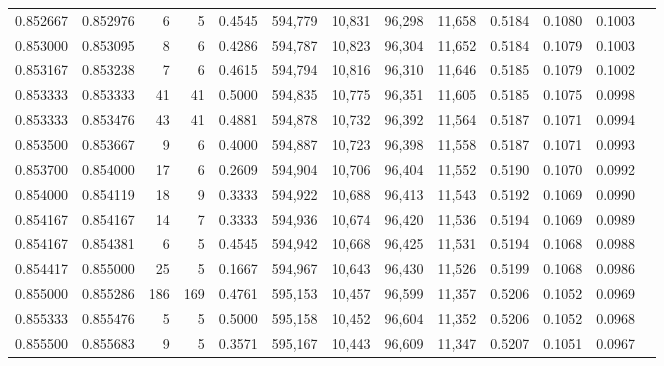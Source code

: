 \begin{tabular}{rrrrrrrrrrrrr}
0.852667 & 0.852976 &     6 &   5 &                                     0.4545 & 594,779 &  10,831 &  96,298 &  11,658 & 0.5184 & 0.1080 & 0.1003 \\
0.853000 & 0.853095 &     8 &   6 &                                     0.4286 & 594,787 &  10,823 &  96,304 &  11,652 & 0.5184 & 0.1079 & 0.1003 \\
0.853167 & 0.853238 &     7 &   6 &                                     0.4615 & 594,794 &  10,816 &  96,310 &  11,646 & 0.5185 & 0.1079 & 0.1002 \\
0.853333 & 0.853333 &    41 &  41 &                                     0.5000 & 594,835 &  10,775 &  96,351 &  11,605 & 0.5185 & 0.1075 & 0.0998 \\
0.853333 & 0.853476 &    43 &  41 &                                     0.4881 & 594,878 &  10,732 &  96,392 &  11,564 & 0.5187 & 0.1071 & 0.0994 \\
0.853500 & 0.853667 &     9 &   6 &                                     0.4000 & 594,887 &  10,723 &  96,398 &  11,558 & 0.5187 & 0.1071 & 0.0993 \\
0.853700 & 0.854000 &    17 &   6 &                                     0.2609 & 594,904 &  10,706 &  96,404 &  11,552 & 0.5190 & 0.1070 & 0.0992 \\
0.854000 & 0.854119 &    18 &   9 &                                     0.3333 & 594,922 &  10,688 &  96,413 &  11,543 & 0.5192 & 0.1069 & 0.0990 \\
0.854167 & 0.854167 &    14 &   7 &                                     0.3333 & 594,936 &  10,674 &  96,420 &  11,536 & 0.5194 & 0.1069 & 0.0989 \\
0.854167 & 0.854381 &     6 &   5 &                                     0.4545 & 594,942 &  10,668 &  96,425 &  11,531 & 0.5194 & 0.1068 & 0.0988 \\
0.854417 & 0.855000 &    25 &   5 &                                     0.1667 & 594,967 &  10,643 &  96,430 &  11,526 & 0.5199 & 0.1068 & 0.0986 \\
0.855000 & 0.855286 &   186 & 169 &                                     0.4761 & 595,153 &  10,457 &  96,599 &  11,357 & 0.5206 & 0.1052 & 0.0969 \\
0.855333 & 0.855476 &     5 &   5 &                                     0.5000 & 595,158 &  10,452 &  96,604 &  11,352 & 0.5206 & 0.1052 & 0.0968 \\
0.855500 & 0.855683 &     9 &   5 &                                     0.3571 & 595,167 &  10,443 &  96,609 &  11,347 & 0.5207 & 0.1051 & 0.0967 \\

\end{tabular}
